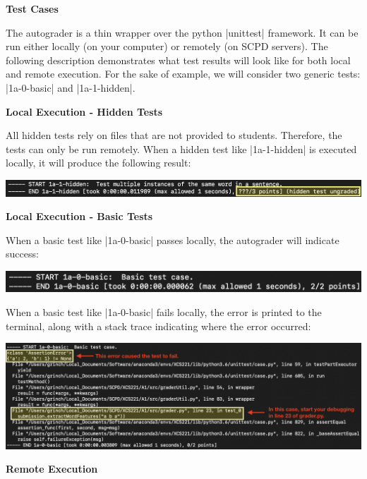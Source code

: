 {\bf Test Cases}

The autograder is a thin wrapper over the python |unittest| framework.  It can
be run either locally (on your computer) or remotely (on SCPD servers).  The
following description demonstrates what test results will look like for both
local and remote execution.  For the sake of example, we will consider two
generic tests: |1a-0-basic| and |1a-1-hidden|.

{\bf Local Execution - Hidden Tests}

All hidden tests rely on files that are not provided to students.  Therefore,
the tests can only be run remotely.  When a hidden test like |1a-1-hidden| is
executed locally, it will produce the following result:

\begin{center}
\includegraphics[width=1\textwidth]{00-instructions/local-hidden.png}
\end{center}

{\bf Local Execution - Basic Tests}

When a basic test like |1a-0-basic| passes locally, the autograder will indicate
success:

\begin{center}
\includegraphics[width=1\textwidth]{00-instructions/local-basic-passed.png}
\end{center}

When a basic test like |1a-0-basic| fails locally, the error is printed to the
terminal, along with a stack trace indicating where the error occurred:

\begin{center}
\includegraphics[width=1\textwidth]{00-instructions/local-basic-failed.png}
\end{center}

{\bf Remote Execution}

